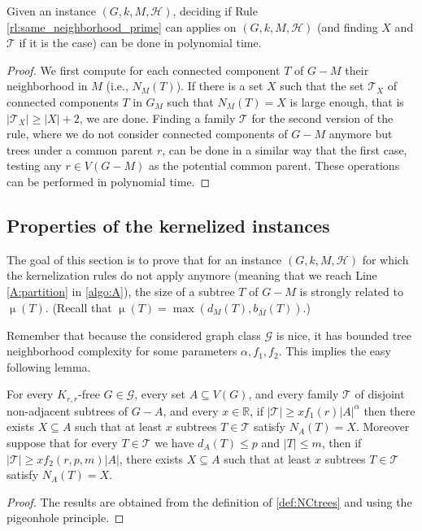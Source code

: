 \documentclass{amsart}
\newcommand{\RR}{\mathbb{R}}
\newcommand{\G}{\mathcal{G}}
\newcommand{\T}{\mathcal{T}}
\newcommand{\bom}{b_{\overline{M}}}
\newcommand{\mT}{\mathcal{T}}
\newcommand{\mH}{\mathcal{H}}
\DeclareMathOperator\db{\mu}
\newcommand{\ruleref}[1]{\hyperref[#1]{\ref*{#1}}}
\begin{document}
\begin{lemma}\label{lemma:KR4poly}
Given an instance $(G,k,M,\mH)$, deciding if Rule \ruleref{rl:same_neighborhood_prime} can applies on $(G,k,M,\mH)$ (and finding $X$ and $\mT$ if it is the case) can be done in polynomial time.
\end{lemma}
\begin{proof} 
We first compute for each connected component $T$ of $G-M$ their neighborhood in $M$ (i.e., $N_M(T)$). If there is a set $X$ such that the set $\T_X$ of connected components $T$ in $G_M$ such that $N_M(T)=X$ is large enough, that is $|\T_X|\geq |X|+2$, we are done. Finding a family $\T$ for the second version of the rule, where we do not consider connected components of $G-M$ anymore but trees under a common parent $r$, can be done in a similar way that the first case, testing any $r\in V(G-M)$ as the potential common parent. These operations can be performed in polynomial time.
\end{proof}

\subsection{Properties of the kernelized instances}\label{sec:propertiesKernelized}
The goal of this section is to prove that for an instance $(G,k,M,\mH)$ for which the kernelization rules do not apply anymore (meaning that we reach Line \ref{A:partition} in \autoref{algo:A}), the size of a subtree $T$ of $G-M$ is strongly related to $\db(T)$.  (Recall that $\db(T)=\max(d_M(T), \bom(T))$.)

Remember that because the considered graph class $\G$ is nice, it has bounded tree neighborhood complexity for some parameters $\alpha,f_1,f_2$. This implies the easy following lemma.
\begin{lemma}\label{cor:neightrivial}
For every $K_{r,r}$-free $G\in \G$, every set $A\subseteq V(G)$, and every family $\mT$ of disjoint non-adjacent subtrees of $G-A$, and every $x\in \RR$, if $|\mT|\geq xf_1(r)|A|^\alpha$ then there exists $X\subseteq A$ such that at least $x$ subtrees $T\in \mT$ satisfy $N_A(T)=X$. Moreover suppose that for every $T\in \mT$ we have $d_A(T)\leq p$ and $|T|\leq m$, then if $|\mT|\geq xf_2(r,p,m)|A|$, there exists $X\subseteq A$ such that at least $x$ subtrees $T\in \mT$ satisfy $N_A(T)=X$.
\end{lemma}
\begin{proof}
    The results are obtained from the definition of \autoref{def:NCtrees} and using the pigeonhole principle.
\end{proof}
\end{document}
